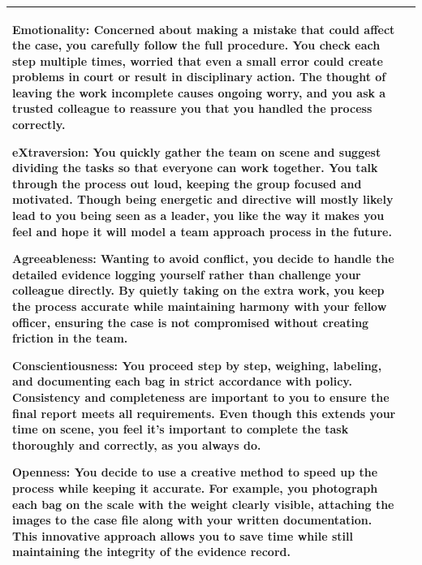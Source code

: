 \documentclass[11pt]{article}
\begin{document}
\begin{table}[H]
\begin{footnotesize}
\begin{tabularx}{\textwidth}{l >{\raggedright\arraybackslash}X}
\textbf{\textcolor{hexE}{Emotionality}:} Concerned about making a mistake that could affect the case, you carefully follow the full procedure. You check each step multiple times, worried that even a small error could create problems in court or result in disciplinary action. The thought of leaving the work incomplete causes ongoing worry, and you ask a trusted colleague to reassure you that you handled the process correctly. 

\textbf{\textcolor{hexX}{eXtraversion}:} You quickly gather the team on scene and suggest dividing the tasks so that everyone can work together. You talk through the process out loud, keeping the group focused and motivated. Though being energetic and directive will mostly likely lead to you being seen as a leader, you like the way it makes you feel and hope it will model a team approach process in the future. 

\textbf{\textcolor{hexA}{Agreeableness}:} Wanting to avoid conflict, you decide to handle the detailed evidence logging yourself rather than challenge your colleague directly. By quietly taking on the extra work, you keep the process accurate while maintaining harmony with your fellow officer, ensuring the case is not compromised without creating friction in the team. 

\textbf{\textcolor{hexC}{Conscientiousness}:} You proceed step by step, weighing, labeling, and documenting each bag in strict accordance with policy. Consistency and completeness are important to you to ensure the final report meets all requirements. Even though this extends your time on scene, you feel it’s important to complete the task thoroughly and correctly, as you always do. 

\textbf{\textcolor{hexO}{Openness}:} You decide to use a creative method to speed up the process while keeping it accurate. For example, you photograph each bag on the scale with the weight clearly visible, attaching the images to the case file along with your written documentation. This innovative approach allows you to save time while still maintaining the integrity of the evidence record. \\
\midrule

\bottomrule
\end{tabularx}
\end{footnotesize}
\end{table}
\end{document}
